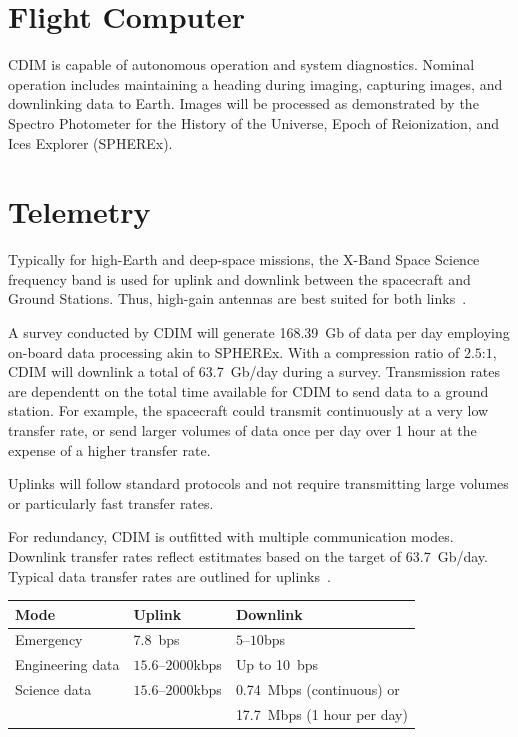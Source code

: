 \documentclass{ws-jai}
\newenvironment{notes}{\color{red}}{}
\begin{document}
\section{Flight Computer}
\begin{notes}
  CDIM is capable of autonomous operation and system diagnostics.
  Nominal operation includes maintaining a heading during imaging, capturing images, and downlinking data to Earth.
  Images will be processed as demonstrated by the Spectro Photometer for the History of the Universe, Epoch of Reionization, and Ices Explorer (SPHEREx).
\end{notes}

\section{Telemetry}
\label{sec:telemetry}
Typically for high-Earth and deep-space missions, the X-Band Space Science frequency band is used for uplink and downlink between the spacecraft and Ground Stations.
Thus, high-gain antennas are best suited for both links~\cite{smad2015}.

A survey conducted by CDIM will generate \SI{168.39}{Gb} of data per day employing on-board data processing akin to SPHEREx.
With a compression ratio of $2.5$:$1$, CDIM will downlink a total of \SI{63.7}{Gb/day} during a survey.
Transmission rates are dependentt on the total time available for CDIM to send data to a ground station.
For example, the spacecraft could transmit continuously at a very low transfer rate, or send larger volumes of data once per day over 1 hour at the expense of a higher transfer rate.

Uplinks will follow standard protocols and not require transmitting large volumes or particularly fast transfer rates.

\begin{wstable}[htp]
  \caption{For redundancy, CDIM is outfitted with multiple communication modes. Downlink transfer rates reflect estitmates based on the target of \SI{63.7}{Gb/day}. Typical data transfer rates are outlined for uplinks~\cite{smad2015}.
\label{tab:telemetry}}
  \begin{tabular}{@{}lll@{}} \toprule
    Mode & Uplink & Downlink \\ \midrule
    Emergency & \SI{7.8}{bps} & $5$--$10$\si{bps} \\
    Engineering data & $15.6$--$2000$\si{kbps} & Up to \SI{10}{bps} \\
    Science data & $15.6$--$2000$\si{kbps} & \SI{0.74}{Mbps} (continuous) or \\
    & & \SI{17.7}{Mbps} (1 hour per day)\\\bottomrule
  \end{tabular}
\end{wstable}
\end{document}
